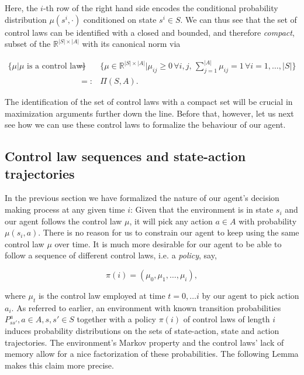 \documentclass[11pt]{article} %
\begin{document}
Here, the $i$-th row of the right hand side encodes the conditional probability distribution $\mu(s^i, \cdot)$ conditioned on state $s^i \in S$. We can thus see that the set of control laws can be identified with a closed and bounded, and therefore \textit{compact}, subset of the $\mathbb{R}^{|S| \times |A|}$ with its canonical norm via

\begin{equation}\label{defPolicySpace}
	\begin{array}{rcl}
		\Big\{ \mu | \mu \text{ is a control law} \Big\} 	& = & \Big\{ \mu \in \mathbb{R}^{|S| \times |A|} \Big| \mu_{ij} \ge 0 \, \forall i,j, \, \sum_{j=1}^{|A|} \mu_{ij} = 1 \, \forall i=1,\dots,|S| \Big\} \\
											& =: & \Pi(S,A).
	\end{array}
\end{equation}

The identification of the set of control laws with a compact set will be crucial in maximization arguments further down the line. Before that, however, let us next see how we can use these control laws to formalize the behaviour of our agent.

\subsection{Control law sequences and state-action trajectories}\label{controlLawTrajs}

In the previous section we have formalized the nature of our agent's decision making process at any given time $i$: Given that the environment is in state $s_i$ and our agent follows the control law $\mu$, it will pick any action $a \in A$ with probability $\mu(s_i,a)$. There is no reason for us to constrain our agent to keep using the same control law $\mu$ over time. It is much more desirable for our agent to be able to follow a sequence of different control laws, i.e. a \textit{policy}, say,

\begin{equation}\label{controlLawSeqence}
	\pi(i) = (\mu_0, \mu_1, \dots, \mu_i),
\end{equation}

where $\mu_t$ is the control law employed at time $t = 0,\dots i$ by our agent to pick action $a_i$. As referred to earlier, an environment with known transition probabilities $P^a_{ss'}, a \in A, s,s' \in S$ together with a policy $\pi(i)$ of control laws of length $i$ induces probability distributions on the sets of state-action, state and action trajectories. The environment's Markov property and the control laws' lack of memory allow for a nice factorization of these probabilities. The following Lemma makes this claim more precise.
\end{document}
